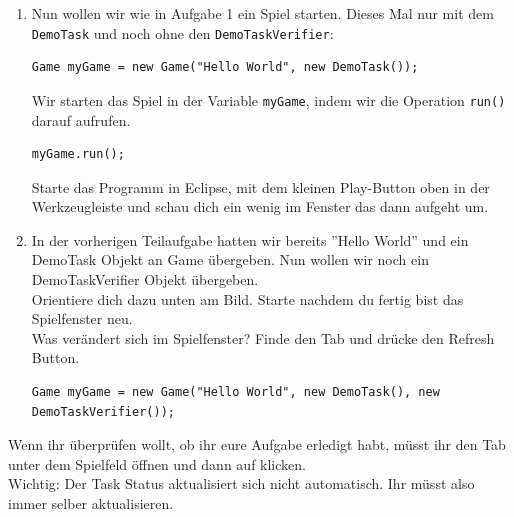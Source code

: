 

\begin{enumerate}
    \item Nun wollen wir wie in Aufgabe 1 ein Spiel starten. 
        Dieses Mal nur mit dem \lstinline{DemoTask} und noch ohne den \lstinline{DemoTaskVerifier}:

    \begin{lstlisting}
Game myGame = new Game("Hello World", new DemoTask());
    \end{lstlisting}

    Wir starten das Spiel in der Variable \lstinline{myGame}, indem wir die Operation \lstinline{run()} darauf aufrufen.

    \begin{lstlisting}
myGame.run();
    \end{lstlisting}

    Starte das Programm in Eclipse, mit dem kleinen Play-Button oben in der Werkzeugleiste und schau dich ein wenig im Fenster das dann aufgeht um.

    \vspace{5mm}

    \item In der vorherigen Teilaufgabe hatten wir bereits ''Hello World'' und ein DemoTask Objekt an Game übergeben.
        Nun wollen wir noch ein DemoTaskVerifier Objekt übergeben.\\
        Orientiere dich dazu unten am Bild. Starte nachdem du fertig bist das Spielfenster neu. \\

        Was verändert sich im Spielfenster? 
        Finde den  Tab und drücke den Refresh Button.

    \begin{lstlisting}
Game myGame = new Game("Hello World", new DemoTask(), new DemoTaskVerifier());
    \end{lstlisting}

\end{enumerate}


\begin{Infobox}
    Wenn ihr überprüfen wollt, ob ihr eure Aufgabe erledigt habt, müsst ihr den  Tab unter dem Spielfeld öffnen und dann auf  klicken.\\

    Wichtig: Der Task Status aktualisiert sich nicht automatisch. Ihr müsst also immer selber aktualisieren.
\end{Infobox}


